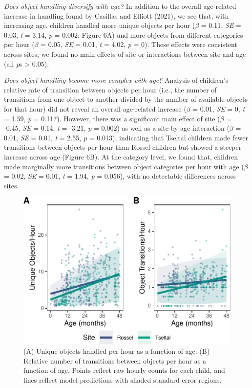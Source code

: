 \documentclass[10pt, letterpaper]{article}
\newenvironment{CodeChunk}{}{}
\begin{document}
\emph{Does object handling diversify with age?} In addition to the
overall age-related increase in handling found by Casillas and Elliott
(2021), we see that, with increasing age, children handled more unique
objects per hour (\(\beta\) = 0.11, \emph{SE} = 0.03, \emph{t} = 3.14,
\emph{p} = 0.002; Figure 6A) and more objects from different categories
per hour (\(\beta\) = 0.05, \emph{SE} = 0.01, \emph{t} = 4.02, \emph{p}
= 0). These effects were consistent across sites; we found no main
effects of site or interactions between site and age (all \emph{p}s
\textgreater{} 0.05).

\emph{Does object handling become more complex with age?} Analysis of
children's relative rate of transition between objects per hour (i.e.,
the number of transitions from one object to another divided by the
number of available objects for that hour) did not reveal an overall
age-related increase (\(\beta\) = 0.01, \emph{SE} = 0, \emph{t} = 1.59,
\emph{p} = 0.117). However, there was a significant main effect of site
(\(\beta\) = -0.45, \emph{SE} = 0.14, \emph{t} = -3.21, \emph{p} =
0.002) as well as a site-by-age interaction (\(\beta\) = 0.01, \emph{SE}
= 0.01, \emph{t} = 2.55, \emph{p} = 0.013), indicating that Tseltal
children made fewer transitions between objects per hour than Rossel
children but showed a steeper increase across age (Figure 6B). At the
category level, we found that, children made marginally more transitions
between object categories per hour with age (\(\beta\) = 0.02, \emph{SE}
= 0.01, \emph{t} = 1.94, \emph{p} = 0.056), with no detectable
differences across sites.

\begin{CodeChunk}
\begin{figure}[!ht]

{\centering \includegraphics{figs/age-effects-fig-1} 

}

\caption[(A) Unique objects handled per hour as a function of age]{(A) Unique objects handled per hour as a function of age. (B) Relative number of transitions between objects per hour as a function of age. Points reflect raw hourly counts for each child, and lines reflect model predictions with shaded standard error regions.}\label{fig:age-effects-fig}
\end{figure}
\end{CodeChunk}
\end{document}
